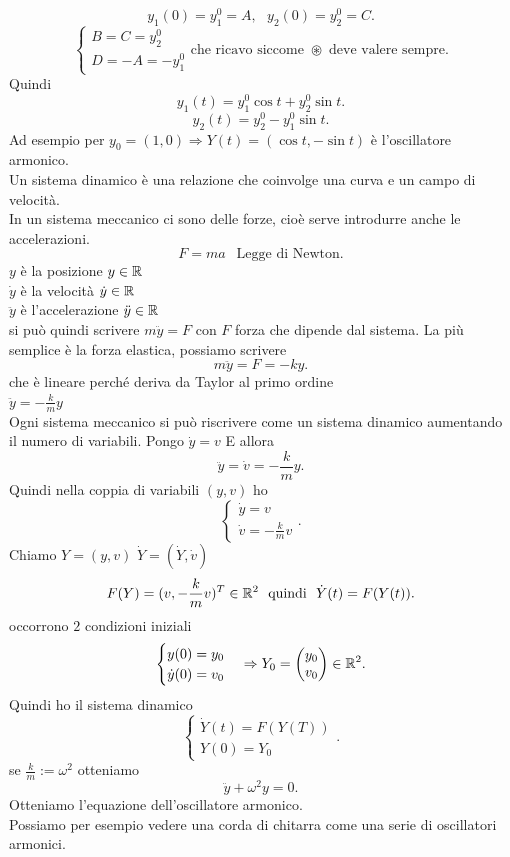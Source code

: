 \documentclass[12px]{article}
\begin{document}
\[
y_1(0) = y_1^0 = A, \ \ \ y_2(0) = y_2^0 = C
.\] 
\[
\begin{cases}
	B = C = y_2^0\\
	D = -A = -y_1^0
\end{cases} \text{che ricavo siccome }\circledast\text{ deve valere sempre}
.\] 
Quindi
\[
y_1(t) = y_1^0\cos t + y_2^0 \sin t
.\] 
\[
y_2(t) = y_2^0 - y_1^0\sin t
.\] 
Ad esempio per $y_0 = (1,0) \Rightarrow  Y(t) = (\cos t, - \sin t)$ è l'oscillatore armonico.\\
Un sistema dinamico è una relazione che coinvolge una curva e un campo di velocità.\\
In un sistema meccanico ci sono delle forze, cioè serve introdurre anche le accelerazioni.\\
\[
	F = ma \ \ \text{ Legge di Newton}
.\] 
$y$ è la posizione $y\in \mathbb{R}$\\
 $\dot y$ è la velocità  $\dot y\in \mathbb{R}$\\
  $\ddot y$ è l'accelerazione $\ddot y\in \mathbb{R}$\\
  si può quindi scrivere  $m\ddot y = F$ con  $F$ forza che dipende dal sistema. La più semplice è la forza elastica, possiamo scrivere
  \[
  m\ddot y = F = -ky
  .\] 
  che è lineare perché deriva da Taylor al primo ordine\\
  $\ddot y = -\frac k m y$\\
  Ogni sistema meccanico si può riscrivere come un sistema dinamico aumentando il numero di variabili. Pongo $\dot y = v$ E allora
   \[
	   \ddot y = \dot v = -\frac k my
  .\] 
  Quindi nella coppia di variabili $(y,v)$ ho
  \[
  \begin{cases}
  	\dot y = v\\
	\dot v = -\frac k m v
  \end{cases}
  .\] 
  Chiamo $Y = (y,v)$ $\dot Y = (\dot Y, \dot v)$
   \[
	   F(Y) = (v,-\frac k mv)^T\in \mathbb{R}^2\ \text{ quindi } \ \dot Y(t) = F(Y(t))
  .\] 
  occorrono $2$ condizioni iniziali
  \[
	  \begin{cases}
  y(0) = y_0\\
  \dot y (0) = v_0
\end{cases} \Rightarrow  Y_0 = \begin{pmatrix}y_0\\v_0\end{pmatrix}\in \mathbb{R}^2
  .\] 
  Quindi ho il sistema dinamico
  \[
  \begin{cases}
  	\dot Y(t) = F(Y(T))\\
	Y(0) = Y_0
  \end{cases}
  .\] 
	se $\frac km := \omega^2$ otteniamo
	 \[
	\ddot y + \omega ^2 y = 0
	.\] 
	Otteniamo l'equazione dell'oscillatore armonico.\\
	Possiamo per esempio vedere una corda di chitarra come una serie di oscillatori armonici.
\end{document}
